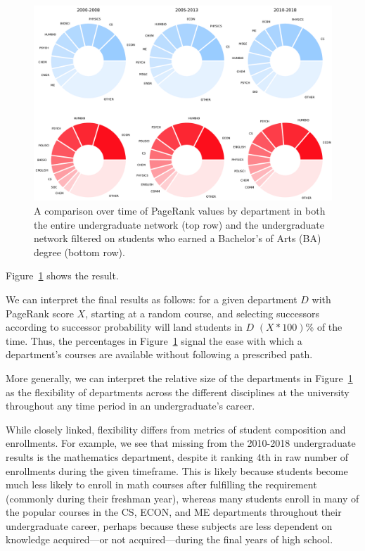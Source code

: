\begin{figure}
    \centering
    \includegraphics[width=\columnwidth]{Figs/final-evolution.pdf}
    \caption{A comparison over time of PageRank values by department
      in both the entire undergraduate network (top row) and the
      undergraduate network filtered on students who earned a
      Bachelor's of Arts (BA) degree (bottom row).}
    \label{fig:evolution}
\end{figure}

Figure~\ref{fig:evolution} shows the result.

We can interpret the final results as follows: for a given department
$D$ with PageRank score $X$, starting at a random course, and
selecting successors according to successor probability will land
students in $D$ $(X * 100)$\% of the time. Thus, the percentages in
Figure~\ref{fig:evolution} signal the ease with which a department's
courses are available without following a prescribed path.

More generally, we can interpret the relative size of the departments
in Figure~\ref{fig:evolution} as the flexibility of departments across
the different disciplines at the university throughout any time period
in an undergraduate's career.



While closely linked, flexibility differs from metrics of student
composition and enrollments. For example, we see that missing from the
2010-2018 undergraduate results is the mathematics department, despite
it ranking 4th in raw number of enrollments during the given
timeframe. This is likely because students become much less likely to
enroll in math courses after fulfilling the requirement (commonly
during their freshman year), whereas many students enroll in many of
the popular courses in the CS, ECON, and ME departments throughout
their undergraduate career, perhaps because these subjects are less
dependent on knowledge acquired---or not acquired---during the final
years of high school.

